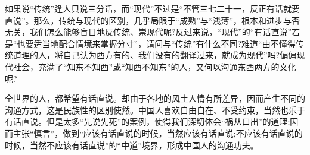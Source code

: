     如果说“传统”逢人只说三分话，而“现代”不过是“不管三七二十一，反正有话就要直说”。那么，传统与现代的区别，几乎局限于“成熟”与“浅薄”，根本和进步与否无关，我们怎么能够盲目地反传统、崇现代呢?反过来说，“现代”的“有话直说”若是“也要适当地配合情境来掌握分寸”，请问与“传统”有什么不同?难道“由不懂得传统道理的人，将自己认为西方有的、我们没有的翻译过来，就成为现代”吗?偏偏现代社会，充满了“知东不知西”或“知西不知东”的人，又何以沟通东西两方的文化呢?

    全世界的人，都希望有话直说。却由于各地的风土人情有所差异，因而产生不同的沟通方式，这是民族性的区别使然。中国人喜欢自由自在、不受约束，当然也乐于有话直说。但是太多“先说先死”的案例，使得我们深切体会“祸从口出”的道理;因而主张“慎言”，做到“应该有话直说的时候，当然应该有话直说;不应该有话直说的时候，当然不应该有话直说”的“中道”境界，形成中国人的沟通功夫。
